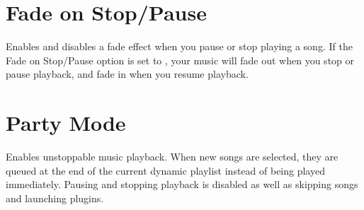 \section{Fade on Stop/Pause}
  Enables and disables a fade effect when you
  pause or stop playing a song. If the Fade on Stop/Pause option is
  set to , your music will fade out when you stop or pause 
  playback, and fade in when you resume playback.
    
\section{Party Mode}
  Enables unstoppable music playback. When new songs are
  selected, they are queued at the end of the current dynamic playlist
  instead of being played immediately. Pausing and stopping playback is
  disabled as well as skipping songs and launching plugins.

